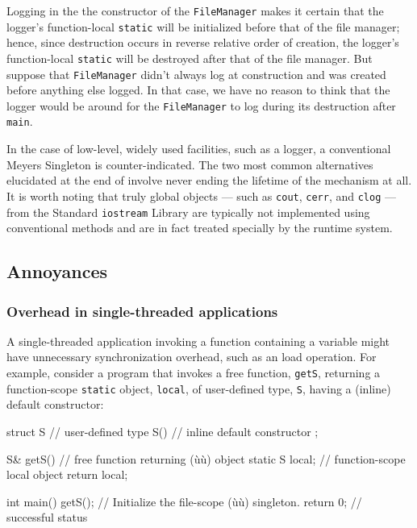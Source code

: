Logging in the the constructor of the \lstinline!FileManager! 
makes it certain that the logger's function-local
\lstinline!static! will be initialized before that of the file manager;
hence, since destruction occurs in reverse relative order of creation,
the logger's function-local \lstinline!static! will be destroyed after that
of the file manager. But suppose that \lstinline!FileManager! didn't always
log at construction and was created before anything else logged. In that
case, we have no reason to think that the logger would be around for the
\lstinline!FileManager! to log during its destruction after \lstinline!main!.

In the case of low-level, widely used facilities, such as a logger, a
conventional Meyers Singleton is counter-indicated. The two most common
alternatives elucidated at the end of  involve never ending the lifetime of
the mechanism at all. It is worth noting that truly global objects ---
such as \lstinline!cout!, \lstinline!cerr!, and \lstinline!clog! --- from the
Standard \lstinline!iostream! Library are typically not implemented using
conventional methods and are in fact treated specially by the runtime system.

\subsection[Annoyances]{Annoyances}\label{annoyances}

\subsubsection[Overhead in single-threaded applications]{Overhead in single-threaded applications}\label{overhead-in-single-threaded-applications}

A single-threaded application invoking a function containing a
  variable might
have unnecessary synchronization overhead, such as an 
load operation. For example, consider a program that invokes a free
function, \lstinline!getS!, returning a function-scope \lstinline!static!
object, \lstinline!local!, of user-defined type, \lstinline!S!, having a
 (inline) default constructor:

\begin{emcppslisting}
struct S  // user-defined type
{
    S() { }  // inline default constructor
};

S& getS()  // free function returning (ù{}ù) object
{
    static S local;  // function-scope local object
    return local;
}

int main()
{
    getS();    // Initialize the file-scope (ù{}ù) singleton.
    return 0;  // successful status
}
\end{emcppslisting}

